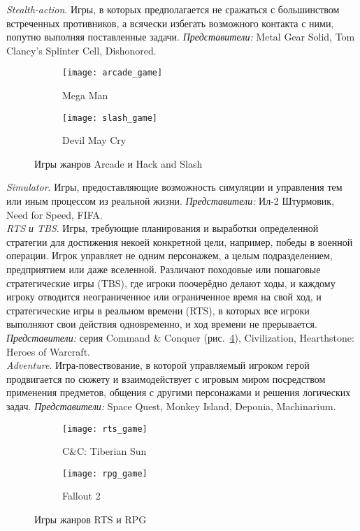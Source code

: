\emph{Stealth-action}. Игры, в которых предполагается не сражаться с большинством встреченных 
противников, а всячески избегать возможного контакта с ними, попутно выполняя поставленные задачи. 
\emph{Представители:} Metal Gear Solid, Tom Clancy's Splinter Cell, Dishonored. \\

\begin{figure}[!ht]
    \centering
    \begin{subfigure}[b]{0.45\textwidth}
        \texttt{[image: arcade\_game]}
        \caption{Mega Man}
        \label{img:mega}
    \end{subfigure}
    \begin{subfigure}[b]{0.45\textwidth}
        \texttt{[image: slash\_game]}
        \caption{Devil May Cry}
        \label{img:dmc}
    \end{subfigure}
    \caption{Игры жанров Arcade и Hack and Slash}
\end{figure}

\emph{Simulator}. Игры, предоставляющие возможность симуляции и управления тем или иным процессом 
из реальной жизни. \emph{Представители:} Ил-2 Штурмовик, Need for Speed, FIFA. \\

\emph{RTS и TBS}. Игры, требующие планирования и выработки определенной стратегии для достижения 
некоей конкретной цели, например, победы в военной операции. Игрок управляет не одним персонажем, а 
целым подразделением, предприятием или даже вселенной. Различают походовые или пошаговые 
стратегические игры (TBS), где игроки поочерёдно делают ходы, и каждому игроку отводится 
неограниченное или ограниченное время на свой ход, и стратегические игры в реальном времени (RTS), 
в которых все игроки выполняют свои действия одновременно, и ход времени не прерывается. 
\emph{Представители:} серия Command \& Conquer (рис.~\ref{img:cnc}), Civilization, 
Hearthstone: Heroes of Warcraft.\\

\emph{Adventure}. Игра-повествование, в которой управляемый игроком герой продвигается по сюжету 
и взаимодействует с игровым миром посредством применения предметов, общения с другими персонажами 
и решения логических задач. \emph{Представители:} Space Quest, Monkey Island, Deponia, Machinarium.\\

\begin{figure}[!ht]
    \centering
    \begin{subfigure}[b]{0.45\textwidth}
        \texttt{[image: rts\_game]}
        \caption{C\&C: Tiberian Sun}
        \label{img:cnc}
    \end{subfigure}
    \begin{subfigure}[b]{0.45\textwidth}
        \texttt{[image: rpg\_game]}
        \caption{Fallout 2}
        \label{img:fallout}
    \end{subfigure}
    \caption{Игры жанров RTS и RPG}
\end{figure}

